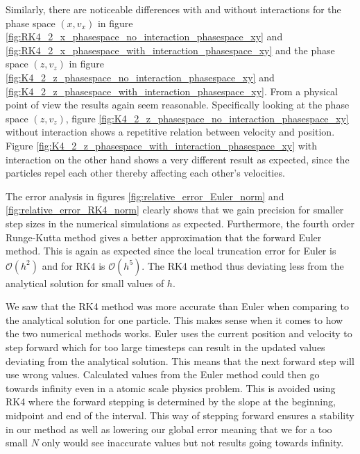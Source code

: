 \documentclass[english,notitlepage,reprint,nofootinbib]{revtex4-1}  %
\begin{document}
Similarly, there are noticeable differences with and without interactions for the phase space $(x, v_x)$ in figure \ref{fig:RK4_2_x_phasespace_no_interaction_phasespace_xy}
and \ref{fig:RK4_2_x_phasespace_with_interaction_phasespace_xy} and the phase space $(z, v_z)$ in figure \ref{fig:K4_2_z_phasespace_no_interaction_phasespace_xy}
and \ref{fig:K4_2_z_phasespace_with_interaction_phasespace_xy}. From a physical point of view the results again seem reasonable. Specifically looking at
the phase space $(z, v_z)$, figure \ref{fig:K4_2_z_phasespace_no_interaction_phasespace_xy} without interaction shows a repetitive relation between velocity and position.
Figure \ref{fig:K4_2_z_phasespace_with_interaction_phasespace_xy} with interaction on the other hand shows a very different result as expected, since the particles
repel each other thereby affecting each other's velocities.



The error analysis in figures \ref{fig:relative_error_Euler_norm} and \ref{fig:relative_error_RK4_norm} clearly shows that we gain
precision for smaller step sizes in the numerical simulations as expected. Furthermore, the fourth order Runge-Kutta method gives a better
approximation that the forward Euler method. This is again as expected since the local truncation error for Euler is $\mathcal{O}(h^2)$ and for RK4 is $\mathcal{O}(h^5)$.
The RK4 method thus deviating less from the analytical solution for small values of $h$.


We saw that the RK4 method was more accurate than Euler when comparing to the analytical solution for one particle. This makes sense when it comes to how the two numerical methods works. Euler uses the current position and velocity to step forward which for too large timesteps can result in the updated values deviating from the analytical solution. This means that the next forward step will use wrong values. Calculated values from the Euler method could then go towards infinity even in a atomic scale physics problem. This is avoided using RK4 where the forward stepping is determined by the slope at the beginning, midpoint and end of the interval. This way of stepping forward ensures a stability in our method as well as lowering our global error meaning that we for a too small $N$ only would see inaccurate values but not results going towards infinity.
\end{document}
